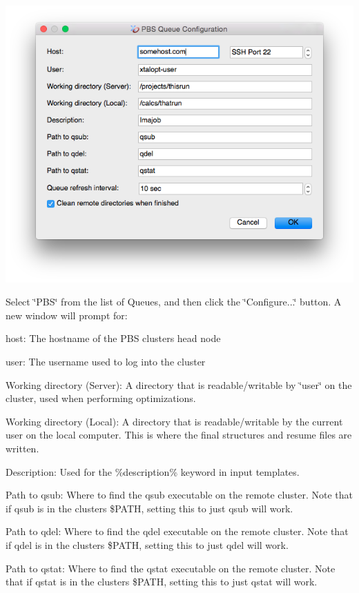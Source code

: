 \begin{DoxyImageNoCaption}
  \mbox{\includegraphics[width=\textwidth]{opt-set-pbs.png}}
\end{DoxyImageNoCaption}


Select \char`\"{}\+P\+B\+S\char`\"{} from the list of Queues, and then click the \char`\"{}\+Configure...\char`\"{} button. A new window will prompt for\+:
\begin{DoxyItemize}
\item host\+: The hostname of the P\+B\+S cluster\textquotesingle{}s head node
\item user\+: The username used to log into the cluster
\item Working directory (Server)\+: A directory that is readable/writable by \char`\"{}user\char`\"{} on the cluster, used when performing optimizations.
\item Working directory (Local)\+: A directory that is readable/writable by the current user on the local computer. This is where the final structures and resume files are written.
\item Description\+: Used for the \%description\% keyword in input templates.
\item Path to qsub\+: Where to find the qsub executable on the remote cluster. Note that if qsub is in the cluster\textquotesingle{}s \$\+P\+A\+T\+H, setting this to just \textquotesingle{}qsub\textquotesingle{} will work.
\item Path to qdel\+: Where to find the qdel executable on the remote cluster. Note that if qdel is in the cluster\textquotesingle{}s \$\+P\+A\+T\+H, setting this to just \textquotesingle{}qdel\textquotesingle{} will work.
\item Path to qstat\+: Where to find the qstat executable on the remote cluster. Note that if qstat is in the cluster\textquotesingle{}s \$\+P\+A\+T\+H, setting this to just \textquotesingle{}qstat\textquotesingle{} will work.
\end{DoxyItemize}

